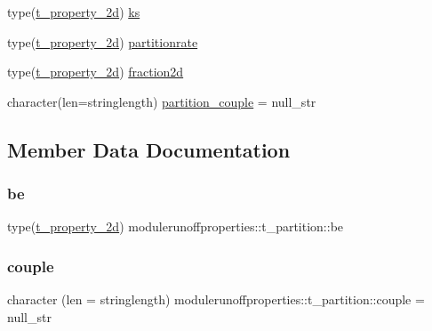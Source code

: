 \begin{DoxyCompactItemize}
\item 
type(\mbox{\hyperlink{structmodulerunoffproperties_1_1t__property__2d}{t\+\_\+property\+\_\+2d}}) \mbox{\hyperlink{structmodulerunoffproperties_1_1t__partition_a22bd8c3aace071fadc30a1d0ed146b53}{ks}}
\item 
type(\mbox{\hyperlink{structmodulerunoffproperties_1_1t__property__2d}{t\+\_\+property\+\_\+2d}}) \mbox{\hyperlink{structmodulerunoffproperties_1_1t__partition_a70fdce9e0118a89200e28c2d6d4d6a22}{partitionrate}}
\item 
type(\mbox{\hyperlink{structmodulerunoffproperties_1_1t__property__2d}{t\+\_\+property\+\_\+2d}}) \mbox{\hyperlink{structmodulerunoffproperties_1_1t__partition_abfcec88a05d07ca247488a904d70ab4c}{fraction2d}}
\item 
character(len=stringlength) \mbox{\hyperlink{structmodulerunoffproperties_1_1t__partition_a5ffcb82c6718729e3392192b69636d62}{partition\+\_\+couple}} = null\+\_\+str
\end{DoxyCompactItemize}


\subsection{Member Data Documentation}
\mbox{\label{structmodulerunoffproperties_1_1t__partition_ae2cb970f17a92e72d257c459cc2e2649}} 
\subsubsection{\texorpdfstring{be}{be}}
{\footnotesize\ttfamily type(\mbox{\hyperlink{structmodulerunoffproperties_1_1t__property__2d}{t\+\_\+property\+\_\+2d}}) modulerunoffproperties\+::t\+\_\+partition\+::be\hspace{0.3cm}{\ttfamily [private]}}

\mbox{\label{structmodulerunoffproperties_1_1t__partition_aa551201116095f2e649b79204abbf7c6}} 
\subsubsection{\texorpdfstring{couple}{couple}}
{\footnotesize\ttfamily character (len = stringlength) modulerunoffproperties\+::t\+\_\+partition\+::couple = null\+\_\+str\hspace{0.3cm}{\ttfamily [private]}}


